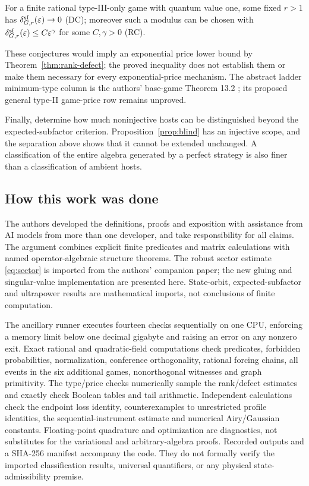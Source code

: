 \begin{conjecture}\label{conj:dilation}
For a finite rational type-III-only game with quantum value one, some fixed $r>1$ has $\delta^{\rm sf}_{G,r}(\varepsilon)\to0$ (DC); moreover such a modulus can be chosen with $\delta^{\rm sf}_{G,r}(\varepsilon)\le C\varepsilon^\gamma$ for some $C,\gamma>0$ (RC).
\end{conjecture}
These conjectures would imply an exponential price lower bound by Theorem~\ref{thm:rank-defect}; the proved inequality does not establish them or make them necessary for every exponential-price mechanism. The abstract ladder minimum-type column is the authors' base-game Theorem 13.2 \cite{Base}; its proposed general type-II game-price row remains unproved.

Finally, determine how much noninjective hosts can be distinguished beyond the expected-subfactor criterion. Proposition~\ref{prop:blind} has an injective scope, and the separation above shows that it cannot be extended unchanged. A classification of the entire algebra generated by a perfect strategy is also finer than a classification of ambient hosts.

\subsection{How this work was done}
The authors developed the definitions, proofs and exposition with assistance from AI models from more than one developer, and take responsibility for all claims. The argument combines explicit finite predicates and matrix calculations with named operator-algebraic structure theorems. The robust sector estimate \eqref{eq:sector} is imported from the authors' companion paper; the new gluing and singular-value implementation are presented here. State-orbit, expected-subfactor and ultrapower results are mathematical imports, not conclusions of finite computation.

The ancillary runner executes fourteen checks sequentially on one CPU, enforcing a memory limit below one decimal gigabyte and raising an error on any nonzero exit. Exact rational and quadratic-field computations check predicates, forbidden probabilities, normalization, conference orthogonality, rational forcing chains, all events in the six additional games, nonorthogonal witnesses and graph primitivity. The type/price checks numerically sample the rank/defect estimates and exactly check Boolean tables and tail arithmetic. Independent calculations check the endpoint loss identity, counterexamples to unrestricted profile identities, the sequential-instrument estimate and numerical Airy/Gaussian constants. Floating-point quadrature and optimization are diagnostics, not substitutes for the variational and arbitrary-algebra proofs. Recorded outputs and a SHA-256 manifest accompany the code. They do not formally verify the imported classification results, universal quantifiers, or any physical state-admissibility premise.
